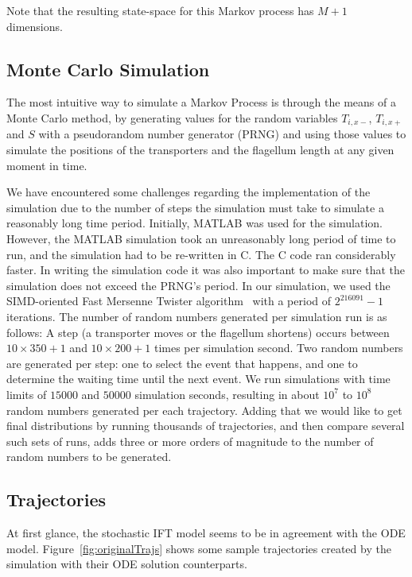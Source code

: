 \documentclass[titlepage]{article}
\begin{document}
Note that the resulting state-space for this Markov process has $M+1$ dimensions.


\subsection{Monte Carlo Simulation}

The most intuitive way to simulate a Markov Process is through the means of a Monte Carlo method, by generating values for the random variables $T_{i,x-}$, $T_{i,x+}$ and $S$ with a pseudorandom number generator (PRNG) and using those values to simulate the positions of the transporters and the flagellum length at any given moment in time.

We have encountered some challenges regarding the implementation of the simulation due to the number of steps the simulation must take to simulate a reasonably long time period.
Initially, MATLAB was used for the simulation. However, the MATLAB simulation took an unreasonably long period of time to run, and the simulation had to be re-written in C.
The C code ran considerably faster.
In writing the simulation code it was also important to make sure that the simulation does not exceed the PRNG's period.
In our simulation, we used the SIMD-oriented Fast Mersenne Twister algorithm~\cite{matsumoto} with a period of $2^{216091}-1$ iterations.
The number of random numbers generated per simulation run is as follows:
A step (a transporter moves or the flagellum shortens) occurs between $10 \times 350+1$ and $10 \times 200+1$ times per simulation second.
Two random numbers are generated per step: one to select the event that happens, and one to determine the waiting time until the next event.
We run simulations with time limits of $15000$ and $50000$ simulation seconds, resulting in about $10^7$ to $10^8$ random numbers generated per each trajectory.
Adding that we would like to get final distributions by running thousands of trajectories, and then compare several such sets of runs, adds three or more orders of magnitude to the number of random numbers to be generated.


\subsection{Trajectories}
At first glance, the stochastic IFT model seems to be in agreement with the ODE model. Figure~\ref{fig:originalTrajs} shows some sample trajectories created by the simulation with their ODE solution counterparts.
\end{document}
